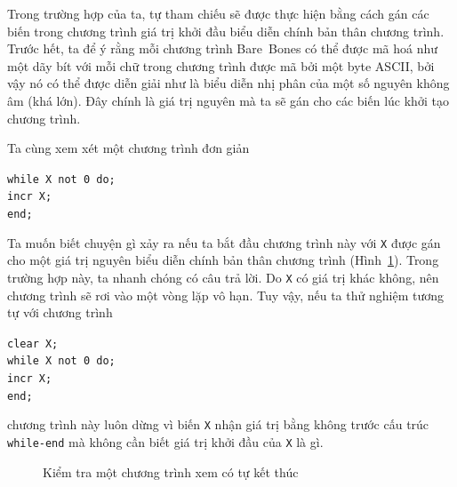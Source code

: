 Trong trường hợp của ta, tự tham chiếu sẽ được thực hiện bằng cách gán các biến trong
chương trình giá trị khởi đầu biểu diễn chính bản thân chương trình. Trước hết, ta để ý
rằng mỗi chương trình Bare~Bones có thể được mã hoá như một dãy bít với mỗi chữ trong
chương trình được mã bởi một byte ASCII, bởi vậy nó có thể được diễn giải như là biểu diễn
nhị phân của một số nguyên không âm (khá lớn). Đây chính là giá trị nguyên mà ta sẽ gán
cho các biến lúc khởi tạo chương trình.
 
Ta cùng xem xét một chương trình đơn giản 

\bigskip

\bigskip

\begin{flushleft}
  \qquad \qquad\qquad \texttt{while X not 0 do;} \\
  \qquad \qquad\qquad \quad \texttt{incr X;} \\
  \qquad\qquad\qquad\texttt{end;}
\end{flushleft}
Ta muốn biết chuyện gì xảy ra nếu ta bắt đầu chương trình này với \texttt{X} được gán cho
một giá trị nguyên biểu diễn chính bản thân chương trình (Hình~\ref{fig:fig116}). Trong
trường hợp này, ta nhanh chóng có câu trả lời. Do \texttt{X} có giá trị khác không, nên
chương trình sẽ rơi vào một vòng lặp vô hạn. Tuy vậy, nếu ta thử nghiệm tương tự với
chương trình
\begin{flushleft}
  \qquad \qquad\qquad \texttt{clear X;}\\
  \qquad \qquad\qquad \texttt{while X not 0 do;} \\
  \qquad \qquad\qquad \quad \texttt{incr X;} \\
  \qquad\qquad\qquad\texttt{end;}
\end{flushleft}
chương trình này luôn dừng vì biến \texttt{X} nhận giá trị bằng không trước cấu trúc
\texttt{while-end} mà không cần biết giá trị khởi đầu của \texttt{X} là gì.
\begin{figure}[tbh]
  \centering 
  \caption{Kiểm tra một chương trình xem có tự kết thúc}
\label{fig:fig116}  
\end{figure}

